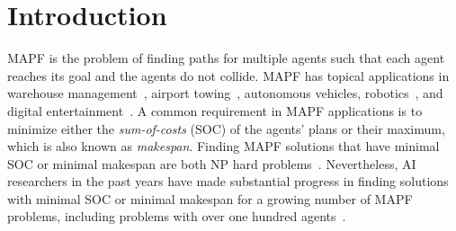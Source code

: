 \documentclass[review]{elsarticle}
\newcommand\konstantin[1]{\nb{\textbf{Konstantin:}}{red}{#1}}
\newcommand\roni[1]{\nb{\textbf{Roni:}}{green}{#1}}
\newcommand{\mapf}{\ac{MAPF}\xspace}
\begin{document}
\linenumbers



\section{Introduction}


\mapf is the problem of finding paths for multiple agents such that each agent reaches its goal and the agents do not collide. \mapf has topical applications in warehouse management~\cite{wurman2008coordinating}, airport towing~\cite{morris2016planning}, autonomous vehicles, robotics~\cite{veloso2015cobots}, and digital entertainment~\cite{ma2017feasibility}.
A common requirement in \mapf applications is to minimize either the \emph{sum-of-costs} (SOC) of the agents' plans 
or their maximum, which is also known as \emph{makespan}. %
Finding \mapf solutions that have minimal SOC or minimal makespan are both NP hard problems~\cite{surynek2010optimization,yu2013structure}.  
Nevertheless, AI researchers in the past years have made substantial progress in finding solutions with minimal SOC or minimal makespan for a growing number of \mapf problems, including problems with over one hundred agents~\cite{sharon2015conflict,sharon2013increasing,wagner2015subdimensional,standley2010finding,felner2018adding,ICTAIpicat,yu2013structure}. 


\end{document}

